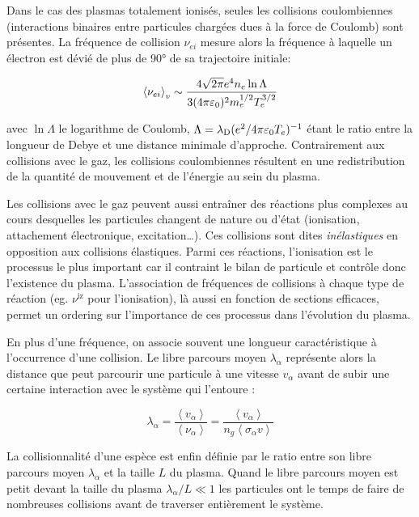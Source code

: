 \begin{refsection}
Dans le cas des plasmas totalement ionisés, seules les collisions coulombiennes 
(interactions binaires entre particules chargées dues à la force de Coulomb)
sont présentes. 
La fréquence de collision $\nu_{ei}$ mesure alors la fréquence à laquelle un
électron est dévié de plus de 90° de sa trajectoire initiale:

\begin{equation}
	\left<\nu_{ei}\right>_v\sim\frac{4\sqrt{2\pi}e^{{4}} n_{e} \ln\Lambda
	}{3(4\pi\varepsilon{_{0}})^{{2}}m_{e}^{{1/2}}T_{e}^{{3/2}}}
\end{equation}

avec $\ln \Lambda$ le logarithme de Coulomb,
$\Lambda=\lambda_\text{D}(e^{{2}}/4\pi\varepsilon{_{0}}
T_{e})^{{-1}}$ étant le ratio entre la longueur de Debye et une
distance minimale d'approche.
Contrairement aux collisions avec le gaz, les
collisions coulombiennes résultent en une redistribution de la quantité de
mouvement et de l'énergie au sein du plasma.

Les collisions avec le gaz peuvent aussi entraîner des réactions plus complexes
au cours desquelles les particules changent de nature ou d'état (ionisation,
attachement électronique, excitation\ldots).
Ces collisions sont dites \emph{inélastiques} en opposition aux collisions
élastiques. Parmi ces réactions, l'ionisation est le processus le plus
important car il contraint le bilan de particule et contrôle donc l'existence
du plasma. L'association de fréquences de collisions à chaque type de réaction
(eg. $\nu^\text{iz}$ pour l'ionisation), là aussi en fonction de sections
efficaces, permet un ordering sur l'importance de ces processus dans l'évolution
du plasma.

En plus d'une fréquence, on associe souvent une longueur caractéristique
à l'occurrence d'une collision. Le libre parcours moyen $\lambda_\alpha$
représente alors la distance que peut parcourir une particule à une vitesse
$v_\alpha$ avant de subir une certaine interaction avec le système qui l'entoure
:

\begin{equation}
	\lambda_\alpha=\frac{\left<v_\alpha\right>}{\left<\nu_\alpha\right>}
	=\frac{\left<v_\alpha\right>}{n_g\left<\sigma_\alpha v\right>}
\end{equation} 

La collisionnalité d'une espèce est enfin
définie par le ratio entre son libre parcours moyen $\lambda_\alpha$ et la
taille $L$ du plasma. Quand le libre parcours moyen est petit devant la
taille du plasma $\lambda_\alpha/L\ll 1$
les particules ont le temps de faire de nombreuses collisions avant de
traverser entièrement le système.


\end{refsection}
